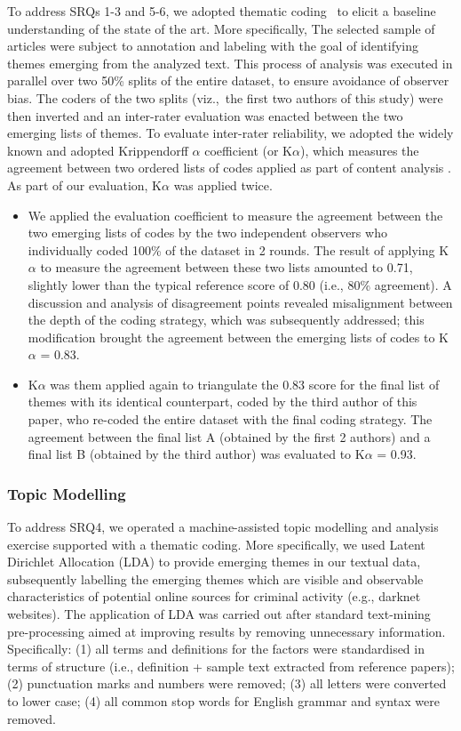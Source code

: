 To address SRQs 1-3 and 5-6, we adopted thematic coding~\cite{Bas03} to elicit a baseline understanding of the state of the art. More specifically, The selected sample of articles were subject to annotation and labeling with the goal of identifying themes emerging from the analyzed text. 
This process of analysis was executed in parallel over two 50\% splits of the entire dataset, to ensure avoidance of observer bias. 
The coders of the two splits (viz.,~the first two authors of this study) were then inverted and an inter-rater evaluation was enacted between the two emerging lists of themes. To evaluate inter-rater reliability, we adopted the widely known and adopted Krippendorff $\alpha$ coefficient (or K$\alpha$), which measures the agreement between two ordered lists of codes applied as part of content analysis \cite{content}. As part of our evaluation, K$\alpha$ was applied twice. 
\begin{itemize}
\item We applied the evaluation coefficient to measure the agreement between the two emerging lists of codes by the two independent observers who individually coded 100\% of the dataset in 2 rounds.
The result of applying K$\alpha$ to measure the agreement between these two lists amounted to 0.71, slightly lower than the typical reference score of 0.80 (i.e., 80\% agreement). A discussion and analysis of disagreement points revealed misalignment between the depth of the coding strategy, which was subsequently addressed; this modification brought the agreement between the emerging lists of codes to K$\alpha$ = 0.83.
\item K$\alpha$ was them applied again to triangulate the 0.83 score for the final list of themes with its identical counterpart, coded by the third author of this paper, who re-coded the entire dataset with the final coding strategy. The agreement between the final list A (obtained by the first 2 authors) and a final list B (obtained by the third author) was evaluated to K$\alpha$ = 0.93.
\end{itemize}

\subsubsection{Topic Modelling}

To address SRQ4, we operated a machine-assisted topic modelling and analysis exercise supported with a thematic coding. More specifically, we used Latent Dirichlet Allocation (LDA) to provide emerging themes in our textual data, subsequently labelling the emerging themes which are visible and observable characteristics of potential online sources for criminal activity (e.g., darknet websites). The application of LDA was carried out after standard text-mining pre-processing aimed at improving results by removing unnecessary information. Specifically: (1) all terms and definitions for the factors were standardised in terms of structure (i.e., definition + sample text extracted from reference papers); (2) punctuation marks and numbers were  removed; (3) all letters were converted to lower case; (4) all common stop words for English grammar and syntax were  removed.

